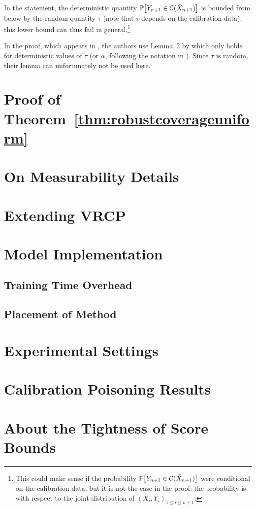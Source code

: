 In the statement, the deterministic quantity $\mathbb{P}\bigl[Y_{n+1} \in \mathcal{C}(\Tilde{X}_{n+1})\bigr]$ is bounded from below by the random quantity $\tau$ (note that $\tau$ depends on the calibration data); this lower bound can thus fail in general.\footnote{This could make sense if the probability $\mathbb{P}\bigl[Y_{n+1} \in \mathcal{C}(\Tilde{X}_{n+1})\bigr]$ were conditional on the calibration data, but it is not the case in the proof: the probability is with respect to the joint distribution of $(X_i,Y_i)_{1 \leq i \leq n+1}$.}

In the proof, which appears in \citet[Appendix S1, Proof of theorem~2]{rscp}, the authors use Lemma~2 by \citet{romano2019conformalized} which only holds for deterministic values of $\tau$ (or $\alpha$, following the notation in \citealt{romano2019conformalized}). Since $\tau$ is random, their lemma can unfortunately not be used here.

\section{Proof of Theorem~\ref{thm:robustcoverageuniform}}
\label{app:new-proof}


\section{On Measurability Details}


\section{Extending VRCP}




\section{Model Implementation}
\label{app:models_experiments}

\subsection{Training Time Overhead}


\subsection{Placement of Method}


\section{Experimental Settings}
\label{app:experimental_settings}


\section{Calibration Poisoning Results}


\pagebreak

\section{About the Tightness of Score Bounds}
\label{app:tightness}


